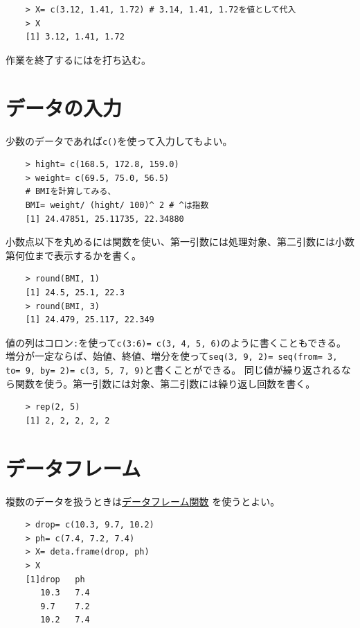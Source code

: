 \begin{verbatim}
    > X= c(3.12, 1.41, 1.72) # 3.14, 1.41, 1.72を値として代入
    > X
    [1] 3.12, 1.41, 1.72
\end{verbatim}

    作業を終了するにはを打ち込む。

\section{データの入力}
    少数のデータであれば\texttt{c()}を使って入力してもよい。
\begin{verbatim}
    > hight= c(168.5, 172.8, 159.0)
    > weight= c(69.5, 75.0, 56.5)
    # BMIを計算してみる、
    BMI= weight/ (hight/ 100)^ 2 # ^は指数
    [1] 24.47851, 25.11735, 22.34880
\end{verbatim}
    小数点以下を丸めるには関数を使い、第一引数には処理対象、第二引数には小数第何位まで表示するかを書く。
\begin{verbatim}
    > round(BMI, 1)
    [1] 24.5, 25.1, 22.3
    > round(BMI, 3)
    [1] 24.479, 25.117, 22.349
\end{verbatim}
    値の列はコロン\texttt{:}を使って\texttt{c(3:6)= c(3, 4, 5, 6)}のように書くこともできる。\\
    増分が一定ならば、始値、終値、増分を使って\texttt{seq(3, 9, 2)= seq(from= 3, to= 9, by= 2)= c(3, 5, 7, 9)}と書くことができる。
    同じ値が繰り返されるなら関数を使う。第一引数には対象、第二引数には繰り返し回数を書く。
\begin{verbatim}
    > rep(2, 5)
    [1] 2, 2, 2, 2, 2
\end{verbatim}

\section{データフレーム}
    複数のデータを扱うときは\underline{データフレーム関数} を使うとよい。
\begin{verbatim}
    > drop= c(10.3, 9.7, 10.2)
    > ph= c(7.4, 7.2, 7.4)
    > X= deta.frame(drop, ph)
    > X
    [1]drop   ph
       10.3   7.4
       9.7    7.2
       10.2   7.4
\end{verbatim}